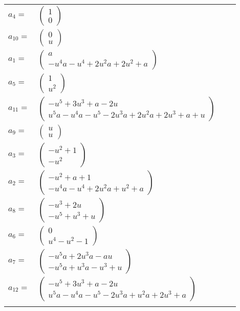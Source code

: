 \documentclass[1p]{elsarticle_modified}
\theoremstyle{definition}
\begin{document}
\begin{tabular}{m{7pt} m{180pt} m{7pt} m{180pt} }
\flushright $a_{4}=$&$\begin{pmatrix}1\\0\end{pmatrix}$ \\
\flushright $a_{10}=$&$\begin{pmatrix}0\\u\end{pmatrix}$ \\
\flushright $a_{1}=$&$\begin{pmatrix}a\\- u^4 a- u^4+2 u^2 a+2 u^2+a\end{pmatrix}$ \\
\flushright $a_{5}=$&$\begin{pmatrix}1\\u^2\end{pmatrix}$ \\
\flushright $a_{11}=$&$\begin{pmatrix}- u^5+3 u^3+a-2 u\\u^5 a- u^4 a- u^5-2 u^3 a+2 u^2 a+2 u^3+a+u\end{pmatrix}$ \\
\flushright $a_{9}=$&$\begin{pmatrix}u\\u\end{pmatrix}$ \\
\flushright $a_{3}=$&$\begin{pmatrix}- u^2+1\\- u^2\end{pmatrix}$ \\
\flushright $a_{2}=$&$\begin{pmatrix}- u^2+a+1\\- u^4 a- u^4+2 u^2 a+u^2+a\end{pmatrix}$ \\
\flushright $a_{8}=$&$\begin{pmatrix}- u^3+2 u\\- u^5+u^3+u\end{pmatrix}$ \\
\flushright $a_{6}=$&$\begin{pmatrix}0\\u^4- u^2-1\end{pmatrix}$ \\
\flushright $a_{7}=$&$\begin{pmatrix}- u^5 a+2 u^3 a- a u\\- u^5 a+u^3 a- u^3+u\end{pmatrix}$ \\
\flushright $a_{12}=$&$\begin{pmatrix}- u^5+3 u^3+a-2 u\\u^5 a- u^4 a- u^5-2 u^3 a+u^2 a+2 u^3+a\end{pmatrix}$\\&\end{tabular}
\end{document}
